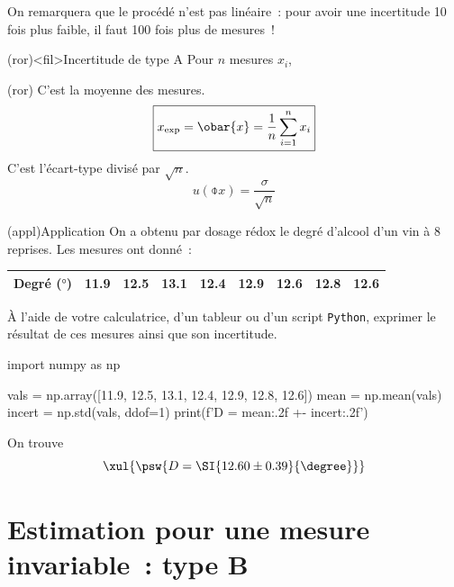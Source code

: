 \documentclass[../main/main.tex]{subfiles}
\begin{document}
On remarquera que le procédé n'est pas linéaire~: pour avoir une incertitude 10
fois plus faible, il faut 100 fois plus de mesures~!

\begin{tcb}(ror)<fil>{Incertitude de type A}
  Pour $n$ mesures $x_i$,
  \smallbreak
  \begin{isd}[cnt](ror)
    C'est la moyenne des mesures.
    \[
      \boxed{x_{\rm exp} = \obar{x} = \frac{1}{n} \sum_{i=1}^{n} x_i}
    \]
    \tcblower
    C'est l'écart-type divisé par $\sqrt{n}$.
    \[
      \boxed{u(\obar{x}) = \frac{\sigma}{\sqrt{n}}}
    \]
  \end{isd}
\end{tcb}

\begin{tcb}(appl){Application}
  On a obtenu par dosage rédox le degré d'alcool d'un vin à 8 reprises. Les
  mesures ont donné~:
  \begin{center}
      \begin{tabular}{lcccccccc}
      \toprule
      Degré ($\si{\degree}$) &
      \num{11.9} &
      \num{12.5} &
      \num{13.1} &
      \num{12.4} &
      \num{12.9} &
      \num{12.6} &
      \num{12.8} &
      \num{12.6}
      \\
      \bottomrule
    \end{tabular}
  \end{center}
  À l'aide de votre calculatrice, d'un tableur ou d'un script \texttt{Python},
  exprimer le résultat de ces mesures ainsi que son incertitude.
  \tcblower
  \begin{python}
import numpy as np

vals = np.array([11.9, 12.5, 13.1, 12.4, 12.9, 12.8, 12.6])
mean = np.mean(vals)
incert = np.std(vals, ddof=1)
print(f'D = {mean:.2f} +- {incert:.2f}')
  \end{python}
    On trouve
    \[
      \xul{
        \psw{
         D = \SI{12.60 \pm  0.39}{\degree}
       }
      }
    \]
\end{tcb}

\section{Estimation pour une mesure invariable~: type B}
\end{document}
